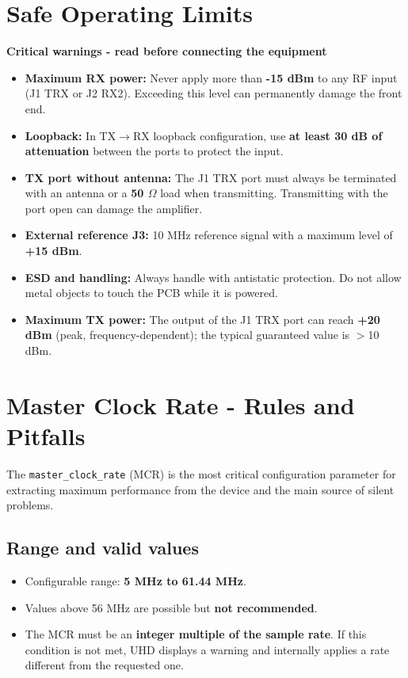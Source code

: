 \documentclass[11pt]{article}
\begin{document}
\section{Safe Operating Limits}

\begin{warningbox}
\textbf{Critical warnings - read before connecting the equipment}
\end{warningbox}

\vspace{4pt}
\begin{itemize}
    \item \textbf{Maximum RX power:} Never apply more than \textbf{-15 dBm} to any RF input (J1 TRX or J2 RX2). Exceeding this level can permanently damage the front end.
    \item \textbf{Loopback:} In TX$\to$RX loopback configuration, use \textbf{at least 30 dB of attenuation} between the ports to protect the input.
    \item \textbf{TX port without antenna:} The J1 TRX port must always be terminated with an antenna or a \textbf{50 $\Omega$} load when transmitting. Transmitting with the port open can damage the amplifier.
    \item \textbf{External reference J3:} 10 MHz reference signal with a maximum level of \textbf{+15 dBm}.
    \item \textbf{ESD and handling:} Always handle with antistatic protection. Do not allow metal objects to touch the PCB while it is powered.
    \item \textbf{Maximum TX power:} The output of the J1 TRX port can reach \textbf{+20 dBm} (peak, frequency-dependent); the typical guaranteed value is $>$10 dBm.
\end{itemize}

\section{Master Clock Rate - Rules and Pitfalls}

The \texttt{master\_clock\_rate} (MCR) is the most critical configuration parameter for extracting maximum performance from the device and the main source of silent problems.

\subsection*{Range and valid values}
\begin{itemize}
    \item Configurable range: \textbf{5 MHz to 61.44 MHz}.
    \item Values above 56 MHz are possible but \textbf{not recommended}.
    \item The MCR must be an \textbf{integer multiple of the sample rate}. If this condition is not met, UHD displays a warning and internally applies a rate different from the requested one.
\end{itemize}
\end{document}
